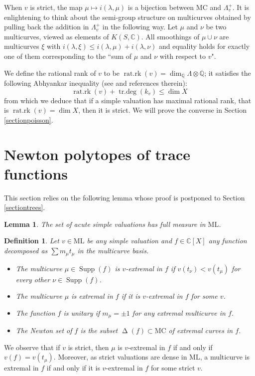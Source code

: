 \documentclass{amsart}
\newtheorem{definition}{Definition}
\newtheorem{lemma}{Lemma}
\newcommand{\C}{\mathbb{C}}
\newcommand{\Q}{\mathbb{Q}}
\newcommand{\ML}{\mathrm{ML}}
\newcommand{\MC}{\mathrm{MC}}
\DeclareMathOperator{\ratrk}{\mathrm{rat.rk}}
\DeclareMathOperator{\degtr}{\mathrm{tr.deg}}
\DeclareMathOperator{\NewSet}{\Delta}
\DeclareMathOperator{\Supp}{Supp}
\begin{document}
When $v$ is strict, the map $\mu\mapsto i(\lambda,\mu)$ is a bijection between $\MC$ and $\Lambda_v^+$. It is enlightening to think about the semi-group structure on multicurves obtained by pulling back the addition in $\Lambda_v^+$ in the following way.
Let $\mu$ and $\nu$ be two multicurves, viewed as elements of $K(S,\C)$. All smoothings of $\mu\cup \nu$ are multicurves $\xi$ with $i(\lambda,\xi)\le i(\lambda,\mu)+i(\lambda,\nu)$ and equality holds for exactly one of them corresponding to the ``sum of $\mu$ and $\nu$ with respect to $v$".

We define the rational rank of $v$ to be $\ratrk(v)=\dim_\Q \Lambda\otimes \Q$; it satisfies the following Abhyankar inequality (see \cite{Otal_compact-repres_2015} and references therein):
$$\ratrk(v)+\degtr(k_v)\le\dim X$$
from which we deduce that if a simple valuation has maximal rational rank, that is $\ratrk(v)=\dim X$, then it is strict. We will prove the converse in Section \ref{sectionpoisson}.

\section{Newton polytopes of trace functions}

This section relies on the following lemma whose proof is postponed to Section \ref{sectiontrees}.

\begin{lemma}
The set of acute simple valuations has full measure in $\ML$.
\end{lemma}


\begin{definition}
Let $v\in \ML$ be any simple valuation and $f \in \C[X]$ any function decomposed as $\sum m_\mu t_\mu$ in the multicurve basis.
\begin{itemize}
\item[-] The multicurve $\mu\in \Supp(f)$ is $v$-extremal in $f$ if  $v(t_\nu)<v(t_\mu)$ for every other $\nu\in \Supp(f)$. 

\item[-] The multicurve $\mu$ is extremal in $f$ if it is $v$-extremal in $f$ for some $v$.

\item[-] The function $f$ is unitary if $m_\mu=\pm 1$ for any extremal multicurve in $f$.

\item[-] The Newton set of $f$ is the subset $\NewSet(f)\subset \MC$ of extremal curves in $f$.

\end{itemize}
\end{definition}
%
We observe that if $v$ is strict, then $\mu$ is $v$-extremal in $f$ if and only if $v(f)=v(t_{\mu})$. Moreover, as strict valuations are dense in $\ML$, a multicurve is extremal in $f$ if and only if it is $v$-extremal in $f$ for some strict $v$.
\end{document}
